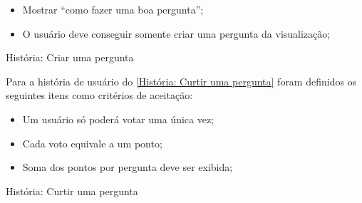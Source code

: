 \begin{itemize}
\item Mostrar ``como fazer uma boa pergunta'';
\item O usuário deve conseguir somente criar uma pergunta da visualização;
\end{itemize}

\def\arraystretch{2}
\begin{quadro}[htb]
\centering
\ABNTEXfontereduzida
\caption[História: Criar uma pergunta]{História: Criar uma pergunta}
\label{Criar uma pergunta}
\end{quadro}
\FloatBarrier 

Para a história de usuário do \autoref{História: Curtir uma pergunta}  foram definidos os seguintes itens como critérios de aceitação:

\begin{itemize}
\item Um usuário só poderá votar uma única vez;
\item Cada voto equivale a um ponto;
\item Soma dos pontos por pergunta deve ser exibida;
\end{itemize}

\def\arraystretch{2}
\begin{quadro}[htb]
\centering
\ABNTEXfontereduzida
\caption[História: Curtir uma pergunta]{História: Curtir uma pergunta}
\label{História: Curtir uma pergunta}
\end{quadro}
\FloatBarrier 

